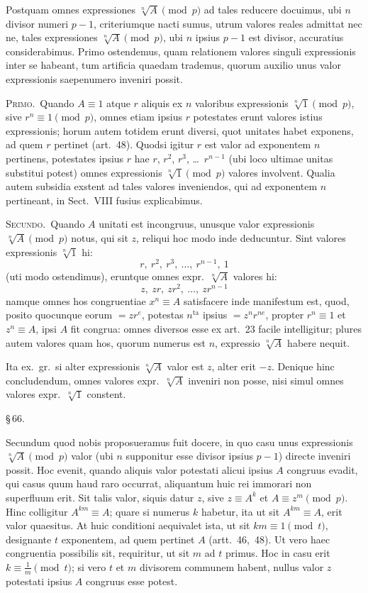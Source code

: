 \documentclass[12pt,a4paper]{article}
\theoremstyle{plain}
\theoremstyle{definition}
\theoremstyle{remark}
\begin{document}
Postquam omnes expressiones $\sqrt[n]{A} \pmod{p}$ ad tales reducere docuimus, ubi $n$ divisor numeri $p-1$, criteriumque nacti sumus, utrum valores reales admittat nec ne, tales expressiones $\sqrt[n]{A} \pmod{p}$, ubi $n$ ipsius $p-1$ est divisor, accuratius considerabimus. Primo ostendemus, quam relationem valores singuli expressionis inter se habeant, tum artificia quaedam trademus, quorum auxilio unus valor expressionis saepenumero inveniri possit.

\textsc{Primo.}\ Quando $A \equiv 1$ atque $r$ aliquis ex $n$ valoribus expressionis $\sqrt[n]{1} \pmod{p}$, sive $r^n \equiv 1 \pmod{p}$, omnes etiam ipsius $r$ potestates erunt valores istius expressionis; horum autem totidem erunt diversi, quot unitates habet exponens, ad quem $r$ pertinet (art.~48). Quodsi igitur $r$ est valor ad exponentem $n$ pertinens, potestates ipsius $r$ hae $r$, $r^2$, $r^3$, \dots\ $r^{n-1}$ (ubi loco ultimae unitas substitui potest) omnes expressionis $\sqrt[n]{1} \pmod{p}$ valores involvent. Qualia autem subsidia exstent ad tales valores inveniendos, qui ad exponentem $n$ pertineant, in Sect.\ VIII fusius explicabimus.

\textsc{Secundo.}\ Quando $A$ unitati est incongruus, unusque valor expressionis $\sqrt[n]{A} \pmod{p}$ notus, qui sit $z$, reliqui hoc modo inde deducuntur. Sint valores expressionis $\sqrt[n]{1}$ hi:
\[
r,\ r^2,\ r^3,\ \dots,\ r^{n-1},\ 1
\]
(uti modo ostendimus), eruntque omnes expr.\ $\sqrt[n]{A}$ valores hi:
\[
z,\ zr,\ zr^2,\ \dots,\ zr^{n-1}
\]
namque omnes hos congruentiae $x^n \equiv A$ satisfacere inde manifestum est, quod, posito quocunque eorum $= zr^e$, potestas $n^\text{ta}$ ipsius $= z^n r^{ne}$, propter $r^n \equiv 1$ et $z^n \equiv A$, ipsi $A$ fit congrua: omnes diversos esse ex art.~23 facile intelligitur; plures autem valores quam hos, quorum numerus est $n$, expressio $\sqrt[n]{A}$ habere nequit.

Ita ex.\ gr.\ si alter expressionis $\sqrt[n]{A}$ valor est $z$, alter erit $-z$. Denique hinc concludendum, omnes valores expr.\ $\sqrt[n]{A}$ inveniri non posse, nisi simul omnes valores expr.\ $\sqrt[n]{1}$ constent.

\begin{center}\S\,66.\end{center}

Secundum quod nobis proposueramus fuit docere, in quo casu unus expressionis $\sqrt[n]{A} \pmod{p}$ valor (ubi $n$ supponitur esse divisor ipsius $p-1$) directe inveniri possit. Hoc evenit, quando aliquis valor potestati alicui ipsius $A$ congruus evadit, qui casus quum haud raro occurrat, aliquantum huic rei immorari non superfluum erit. Sit talis valor, siquis datur $z$, sive $z \equiv A^k$ et $A \equiv z^m \pmod{p}$. Hinc colligitur $A^{km} \equiv A$; quare si numerus $k$ habetur, ita ut sit $A^{km} \equiv A$, erit valor quaesitus. At huic conditioni aequivalet ista, ut sit $km \equiv 1 \pmod{t}$, designante $t$ exponentem, ad quem pertinet $A$ (artt.~46,~48). Ut vero haec congruentia possibilis sit, requiritur, ut sit $m$ ad $t$ primus. Hoc in casu erit $k \equiv \frac{1}{m} \pmod{t}$; si vero $t$ et $m$ divisorem communem habent, nullus valor $z$ potestati ipsius $A$ congruus esse potest.
\end{document}
